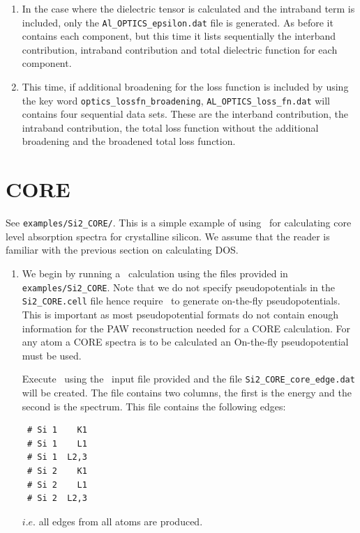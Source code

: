 \documentclass[a4paper,11pt,twoside]{book}
\begin{document}
{\begin{enumerate}
\item In the case where the dielectric tensor is calculated and the intraband term is included, only the \verb#Al_OPTICS_epsilon.dat#  file is generated.  As before it contains each component, but this time it lists sequentially the interband contribution, intraband contribution and total dielectric function for each component.   

\item This time, if additional broadening for the loss function is included by using the key word \verb#optics_lossfn_broadening#, \verb#AL_OPTICS_loss_fn.dat# will contains four sequential data sets.  These are the interband contribution, the intraband contribution, the total loss function without the additional broadening and the broadened total loss function.  
\end{enumerate}

\section{CORE}
See  \verb#examples/Si2_CORE/#. This is a simple example of using \optados\ for calculating core level absorption spectra for crystalline silicon.  We assume that the reader is familiar with the previous section on calculating DOS.  
\begin{enumerate}
\item We begin by running a \castep\ calculation using the files provided in \verb#examples/Si2_CORE#.  Note that we do not specify pseudopotentials in the \verb#Si2_CORE.cell# file hence require \castep\ to generate on-the-fly pseudopotentials.  This is important as most pseudopotential formats do not contain enough information for the PAW reconstruction needed for a CORE calculation. For any atom a CORE spectra is to be calculated an On-the-fly pseudopotential must be used.

Execute \optados\ using the \optados\ input file provided and the file \verb#Si2_CORE_core_edge.dat# will be created.  The file contains two columns, the first is the energy and the second is the spectrum.  This file contains the following edges:

\begin{verbatim}
 # Si 1    K1
 # Si 1    L1
 # Si 1  L2,3
 # Si 2    K1
 # Si 2    L1
 # Si 2  L2,3
\end{verbatim}
$i.e.$ all edges from all atoms are produced.    


\end{enumerate}}
\end{document}
